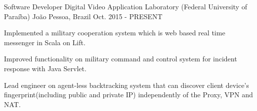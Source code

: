 

\begin{cventries}

  \cventry
    {Software Developer} %
    {Digital Video Application Laboratory (Federal University of Paraíba)} %
    {João Pessoa, Brazil} %
    {Oct. 2015 - PRESENT} %
    {
      \begin{cvitems} %
        \item {Implemented a military cooperation system which is web based real time messenger in Scala on Lift.}
        \item {Improved functionality on military command and control system for incident response with Java Servlet.}
        \item {Lead engineer on agent-less backtracking system that can discover client device's fingerprint(including public and private IP) independently of the Proxy, VPN and NAT.}
      \end{cvitems}
    }

\end{cventries}
